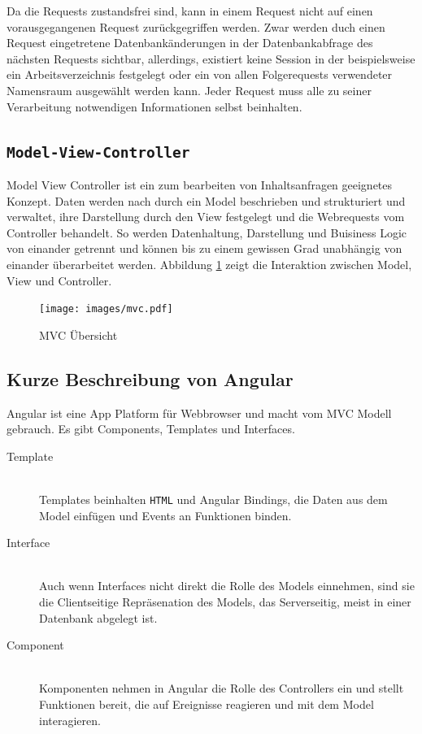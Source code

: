 Da die Requests zustandsfrei sind, kann in einem Request nicht auf
einen vorausgegangenen Request zurückgegriffen werden. Zwar werden
duch einen Request eingetretene Datenbankänderungen in der
Datenbankabfrage des nächsten Requests sichtbar, allerdings, existiert
keine Session in der beispielsweise ein Arbeitsverzeichnis festgelegt
oder ein von allen Folgerequests verwendeter Namensraum ausgewählt
werden kann. Jeder Request muss alle zu seiner Verarbeitung
notwendigen Informationen selbst beinhalten.

\subsection{\texttt{Model-View-Controller}}
Model View Controller ist ein zum bearbeiten von Inhaltsanfragen geeignetes
Konzept. Daten werden nach durch ein Model beschrieben und strukturiert und
verwaltet, ihre Darstellung durch den View festgelegt und die Webrequests vom
Controller behandelt. So werden Datenhaltung, Darstellung und Buisiness Logic
von einander getrennt und können bis zu einem gewissen Grad unabhängig von
einander überarbeitet werden. Abbildung \ref{fig:mvc} zeigt die Interaktion
zwischen Model, View und Controller.

\begin{figure}
  \centering
  \texttt{[image: images/mvc.pdf]}
  \caption{MVC Übersicht}
  \label{fig:mvc}
\end{figure}

\subsection{Kurze Beschreibung von Angular}

Angular ist eine App Platform für Webbrowser und macht vom MVC Modell gebrauch.
Es gibt Components, Templates und Interfaces.
\begin{description}
  \item[Template] \mbox{} \\ Templates beinhalten \texttt{HTML} und Angular
    Bindings, die Daten aus dem Model einfügen und Events an Funktionen binden.
  \item[Interface] \mbox{} \\ Auch wenn Interfaces nicht direkt die Rolle des
    Models einnehmen, sind sie die Clientseitige Repräsenation des Models, das
    Serverseitig, meist in einer Datenbank abgelegt ist.
  \item[Component] \mbox{} \\ Komponenten nehmen in Angular die Rolle des
    Controllers ein und stellt Funktionen bereit, die auf Ereignisse reagieren
    und mit dem Model interagieren.
\end{description}

